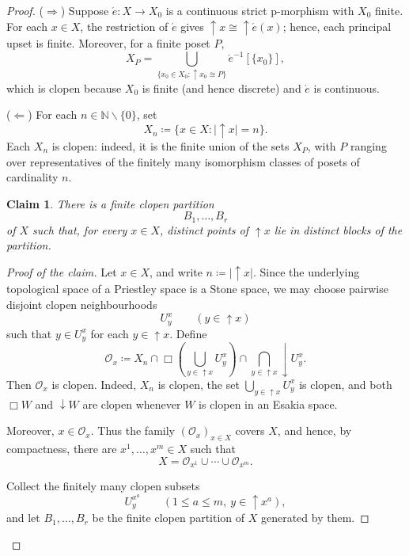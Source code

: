 \documentclass[12pt]{amsart}
\theoremstyle{plain}
\newtheorem{claim}[theorem]{Claim}
\theoremstyle{definition}
\newcommand{\N}{\mathbb{N}}
\renewcommand{\u}{{\uparrow}}
\renewcommand{\d}{{\downarrow}}
\begin{document}
\begin{proof}
    ($\Rightarrow$) Suppose $\acute e \colon X\to X_0$ is a continuous strict p-morphism with $X_0$ finite. For each $x \in X$, the restriction of $\acute{e}$ gives $\u x\cong\u\acute e(x)$; hence, each principal upset is finite. Moreover, for a finite poset $P$,
    \[
    X_P=\bigcup_{\{x_0\in X_0:\u x_0\cong P\}}\acute e^{-1}[\{x_0\}],
    \]
    which is clopen because $X_0$ is finite (and hence discrete) and $\acute e$ is continuous.

    ($\Leftarrow$)
    For each $n\in\N\smallsetminus\{0\}$, set
    \[
        X_n\coloneqq \{x\in X:\lvert{\u}x\rvert=n\}.
    \]
    Each $X_n$ is clopen: indeed, it is the finite union of the sets $X_P$, with $P$
    ranging over representatives of the finitely many isomorphism classes of posets of
    cardinality $n$.

    \begin{claim} \label{claim:finite-clopen-partition-separating-principal-upsets}
        There is a finite clopen partition
        \[
            B_1,\dots,B_r
        \]
        of $X$ such that, for every $x\in X$, distinct points of ${\u}x$ lie in distinct
        blocks of the partition.
    \end{claim}

    \begin{proof}[Proof of the claim]
        Let $x\in X$, and write $n\coloneqq \lvert{\u}x\rvert$. Since the underlying topological space of a Priestley space is a Stone space, we may choose pairwise
        disjoint clopen neighbourhoods
        \[
            U^x_y\qquad(y\in{\u}x)
        \]
        such that $y\in U^x_y$ for each $y\in{\u}x$. Define
        \[
            \mathcal{O}_x
            \coloneqq
            X_n
            \cap
            \Box\left(\bigcup_{y\in{\u}x}U^x_y\right)
            \cap
            \bigcap_{y\in{\u}x}{\d}U^x_y.
        \]
        Then $\mathcal{O}_x$ is clopen. Indeed, $X_n$ is clopen, the set
        $\bigcup_{y\in{\u}x}U^x_y$ is clopen, and both $\Box W$ and ${\d}W$ are clopen
        whenever $W$ is clopen in an Esakia space.

        Moreover, $x\in\mathcal{O}_x$. Thus the family $(\mathcal{O}_x)_{x\in X}$
        covers $X$, and hence, by compactness, there are $x^1,\dots,x^m\in X$ such that
        \[
            X=\mathcal{O}_{x^1}\cup\cdots\cup\mathcal{O}_{x^m}.
        \]

        Collect the finitely many clopen subsets
        \[
            U^{x^a}_y
            \qquad
            (1\leq a\leq m,\ y\in{\u}x^a),
        \]
        and let $B_1,\dots,B_r$ be the finite clopen partition of $X$ generated by them.


\end{proof}
\end{proof}
\end{document}
